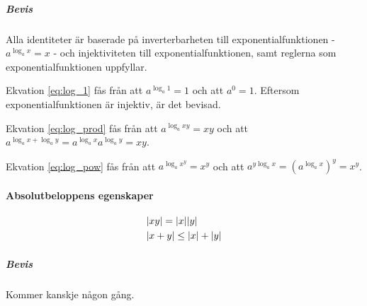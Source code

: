 \subparagraph{Bevis}

Alla identiteter är baserade på inverterbarheten till exponentialfunktionen - $a^{\log_a x} = x$ - och injektiviteten till exponentialfunktionen, samt reglerna som exponentialfunktionen uppfyllar.

Ekvation \ref{eq:log_1} fås från att $a^{\log_a 1} = 1$ och att $a^0 = 1$. Eftersom exponentialfunktionen är injektiv, är det bevisad.

Ekvation \ref{eq:log_prod} fås från att $a^{\log_a xy} = xy$ och att $a^{\log_a x + \log_a y} = a^{\log_a x}a^{\log_a y}=xy$.

Ekvation \ref{eq:log_pow} fås från att $a^{\log_a x^y} = x^y$ och att $a^{y\log_a x} = \left(a^{\log_a x}\right)^y = x^y$.

\paragraph{Absolutbeloppens egenskaper}

\begin{align}
	&\abs{xy} = \abs{x}\abs{y} \label{eq:abs_prod} \\
	&\abs{x + y} \leq \abs{x} + \abs{y} \label{eq:abs_sum}
\end{align}

\subparagraph{Bevis}

Kommer kanskje någon gång.